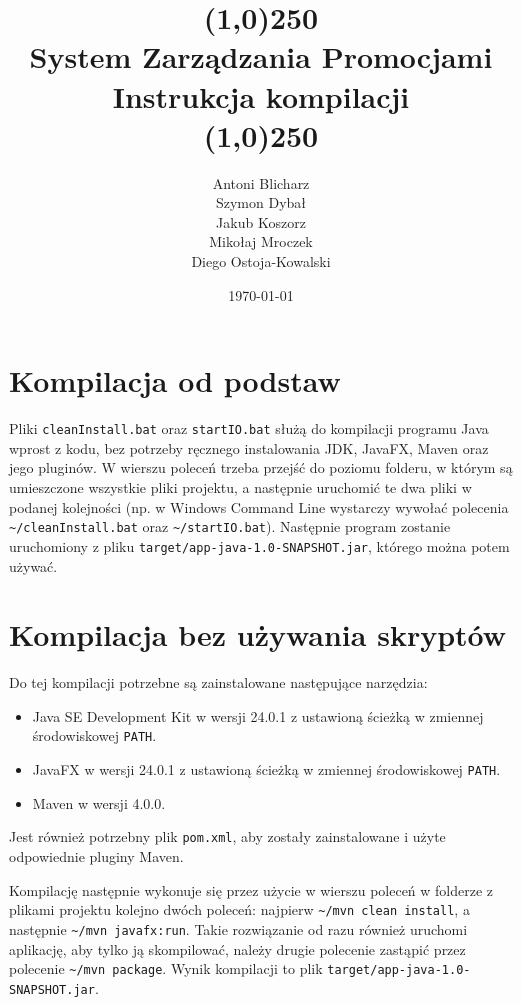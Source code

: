 \documentclass[a4paper,12pt]{article}
\title{
    \line(1,0){250}\\
    System Zarządzania Promocjami\\
    Instrukcja kompilacji\\
    \line(1,0){250}}
\author{Antoni Blicharz\\
        Szymon Dybał\\
        Jakub Koszorz\\
        Mikołaj Mroczek\\
        Diego Ostoja-Kowalski\\}
\date{\today}
\begin{document}
\begin{titlepage}
    \maketitle
\end{titlepage}

\newpage

\section{Kompilacja od podstaw}

Pliki \texttt{cleanInstall.bat} oraz \texttt{startIO.bat} służą do kompilacji programu Java wprost z kodu, bez potrzeby ręcznego instalowania JDK, JavaFX, Maven oraz jego pluginów.
W wierszu poleceń trzeba przejść do poziomu folderu, w którym są umieszczone wszystkie pliki projektu, a następnie uruchomić te dwa pliki w podanej kolejności (np. w Windows Command Line wystarczy wywołać polecenia \texttt{\~{}/cleanInstall.bat} oraz \texttt{\~{}/startIO.bat}).
Następnie program zostanie uruchomiony z pliku \texttt{target/app-java-1.0-SNAPSHOT.jar}, którego można potem używać.

\section{Kompilacja bez używania skryptów}

Do tej kompilacji potrzebne są zainstalowane następujące narzędzia:
\begin{itemize}
    \item Java SE Development Kit w wersji 24.0.1 z ustawioną ścieżką w zmiennej środowiskowej \texttt{PATH}.
    \item JavaFX w wersji 24.0.1 z ustawioną ścieżką w zmiennej środowiskowej \texttt{PATH}.
    \item Maven w wersji 4.0.0.
\end{itemize}
Jest również potrzebny plik \texttt{pom.xml}, aby zostały zainstalowane i użyte odpowiednie pluginy Maven.

Kompilację następnie wykonuje się przez użycie w wierszu poleceń w folderze z plikami projektu kolejno dwóch poleceń: najpierw \texttt{\~{}/mvn clean install}, a następnie \texttt{\~{}/mvn javafx:run}.
Takie rozwiązanie od razu również uruchomi aplikację, aby tylko ją skompilować, należy drugie polecenie zastąpić przez polecenie \texttt{\~{}/mvn package}.
Wynik kompilacji to plik \texttt{target/app-java-1.0-SNAPSHOT.jar}.
\end{document}
